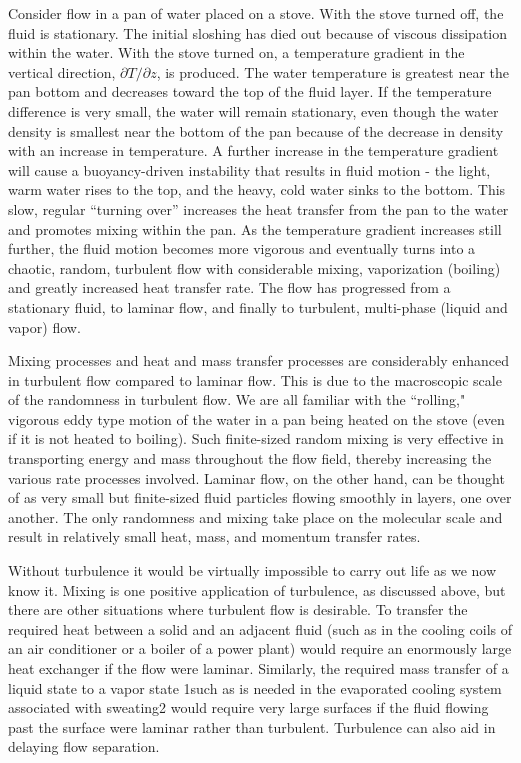 \documentclass[12pt,a4paper]{article}
\begin{document}
Consider flow in a pan of water placed on a stove. With the stove turned off, the fluid is stationary. The initial sloshing has died out because of viscous dissipation within the water. With the stove turned on, a temperature gradient in the vertical direction, $\partial T/\partial z$, is produced. The water temperature is greatest near the pan bottom and decreases toward the top of the fluid layer. If the temperature difference is very small, the water will remain stationary, even though the water density is smallest near the bottom of the pan because of the decrease in density with an increase in temperature. A further increase in the temperature gradient will cause a buoyancy-driven instability that results in fluid motion - the light, warm water rises to the top, and the heavy, cold water sinks to the bottom. This slow, regular “turning over” increases the heat transfer from the pan to the water and promotes mixing within the pan. As the temperature gradient increases still further, the fluid motion becomes more vigorous and eventually turns into a chaotic, random, turbulent flow with considerable mixing, vaporization (boiling) and greatly increased heat transfer rate. The flow has progressed from a stationary fluid, to laminar flow, and finally to turbulent, multi-phase (liquid and vapor) flow.


Mixing processes and heat and mass transfer processes are considerably enhanced in turbulent flow compared to laminar flow. This is due to the macroscopic scale of the randomness in turbulent flow. We are all familiar with the ``rolling," vigorous eddy type motion of the water in a pan being heated on the stove (even if it is not heated to boiling). Such finite-sized random mixing is very effective in transporting energy and mass throughout the flow field, thereby increasing the various rate processes involved. Laminar flow, on the other hand, can be thought of as very small but finite-sized fluid particles flowing smoothly in layers, one over another. The only randomness and mixing take place on the molecular scale and result in relatively small heat, mass, and momentum transfer rates.


Without turbulence it would be virtually impossible to carry out life as we now know it. Mixing is one positive application of turbulence, as discussed above, but there are other situations where turbulent flow is desirable. To transfer the required heat between a solid and an adjacent fluid (such as in the cooling coils of an air conditioner or a boiler of a power plant) would require an enormously large heat exchanger if the flow were laminar. Similarly, the required mass transfer of a liquid state to a vapor state 1such as is needed in the evaporated cooling system associated with sweating2 would require very large surfaces if the fluid flowing past the surface were laminar rather than turbulent. Turbulence can also aid in delaying flow separation.
\end{document}
